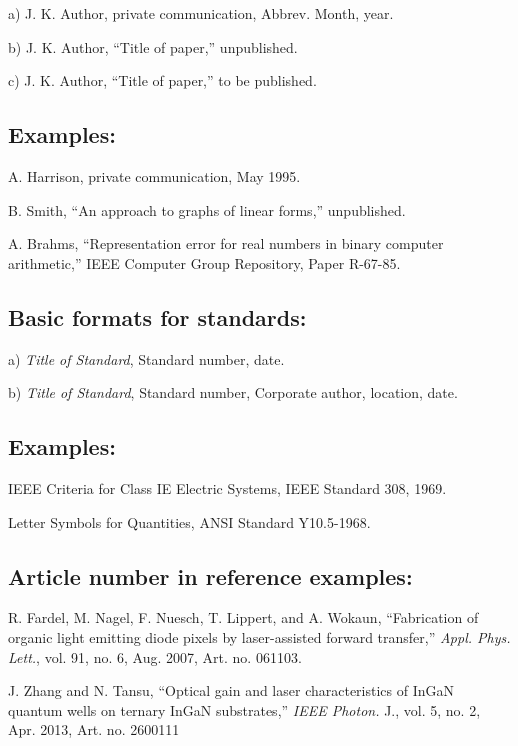 \documentclass[journal]{IEEEtran}
\begin{document}
a) J. K. Author, private communication, Abbrev. Month, year.

b) J. K. Author, ``Title of paper,'' unpublished.

c) J. K. Author, ``Title of paper,'' to be published.

\subsection*{Examples:}

\begin{thebibliography}{34}
\setcounter{enumiv}{26}

\bibitem{}A. Harrison, private communication, May 1995.

\bibitem{}B. Smith, ``An approach to graphs of linear forms,'' unpublished.

\bibitem{}A. Brahms, ``Representation error for real numbers in binary computer arithmetic,'' IEEE Computer Group Repository, Paper R-67-85.
\end{thebibliography}

\subsection*{Basic formats for standards:}

a) {\em Title of Standard}, Standard number, date.

b) {\em Title of Standard}, Standard number, Corporate author, location, date.

\subsection*{Examples:}

\begin{thebibliography}{34}
\setcounter{enumiv}{29}


\bibitem{}IEEE Criteria for Class IE Electric Systems, IEEE Standard 308, 1969.

\bibitem{} Letter Symbols for Quantities, ANSI Standard Y10.5-1968.
\end{thebibliography}

\subsection*{Article number in reference examples:}

\begin{thebibliography}{34}
\setcounter{enumiv}{31}

\bibitem{}R. Fardel, M. Nagel, F. Nuesch, T. Lippert, and A. Wokaun, ``Fabrication of organic light emitting diode pixels by laser-assisted forward transfer,'' {\em Appl. Phys. Lett.}, vol. 91, no. 6, Aug. 2007, Art. no. 061103. 

\bibitem{} J. Zhang and N. Tansu, ``Optical gain and laser characteristics of InGaN quantum wells on ternary InGaN substrates,'' {\em IEEE Photon.} J., vol. 5, no. 2, Apr. 2013, Art. no. 2600111
\end{thebibliography}
\end{document}
